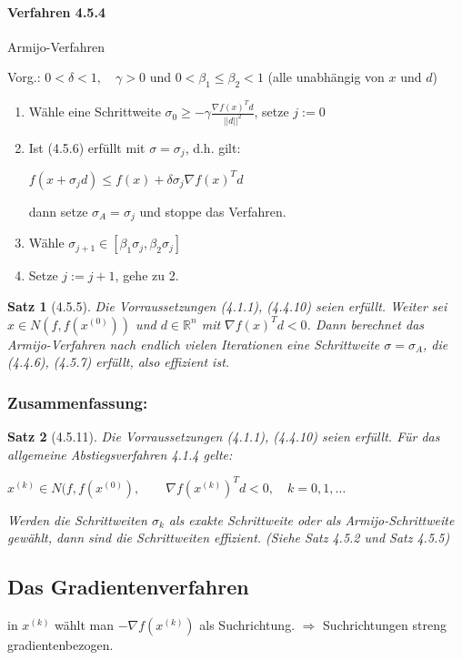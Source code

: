 \documentclass[ngerman,halfparskip]{scrartcl}
\newtheorem*{satz}{Satz}
\theoremstyle{definition}
\def\R{\mathbb R}
\begin{document}
\paragraph{Verfahren 4.5.4} Armijo-Verfahren

Vorg.: $0<\delta <1, \quad \gamma>0$ und $0<\beta_1\leq \beta _2<1$ (alle unabhängig von $x$ und $d$)
\begin{enumerate}
\item Wähle eine Schrittweite $\sigma_0\geq -\gamma \frac{\nabla f(x)^Td}{||d||^2}$, setze $j:=0$
\item Ist (4.5.6) erfüllt mit $\sigma=\sigma_j$, d.h. gilt:

$f(x+\sigma_j d)\leq f(x)+\delta\sigma_j \nabla f(x)^Td$

dann setze $\sigma_A=\sigma_j$ und stoppe das Verfahren.
\item Wähle $\sigma_{j+1}\in [\beta_1\sigma_j,\beta_2\sigma_j]$
\item Setze $j:=j+1$, gehe zu 2.
\end{enumerate}

\begin{satz}[4.5.5]
Die Vorraussetzungen (4.1.1), (4.4.10) seien erfüllt. Weiter sei $x\in N(f,f(x^{(0)}))$ und $d\in\R^n$ mit $\nabla f(x)^Td<0$. Dann berechnet das Armijo-Verfahren nach endlich vielen Iterationen eine Schrittweite $\sigma=\sigma_A$, die (4.4.6), (4.5.7) erfüllt, also effizient ist.
\end{satz}

\subsubsection*{Zusammenfassung:}
\begin{satz}[4.5.11]
Die Vorraussetzungen (4.1.1), (4.4.10) seien erfüllt. Für das allgemeine Abstiegsverfahren 4.1.4 gelte:

$x^{(k)}\in N(f,f(x^{(0)}), \qquad \nabla f (x^{(k)})^Td<0, \quad k=0, 1, \ldots$

Werden die Schrittweiten $\sigma_k$ als exakte Schrittweite oder als Armijo-Schrittweite gewählt, dann sind die Schrittweiten effizient. (Siehe Satz 4.5.2 und Satz 4.5.5)
\end{satz}

\subsection*{Das Gradientenverfahren}
in $x^{(k)}$ wählt man $-\nabla f(x^{(k)})$ als Suchrichtung. $\Rightarrow$ Suchrichtungen streng gradientenbezogen.
\end{document}
